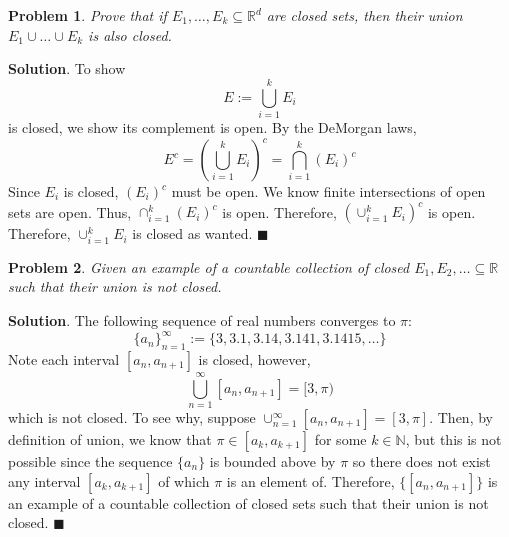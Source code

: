 \documentclass[12pt]{article}
\renewcommand{\=}[1]{\stackrel{#1}{=}} %
\newtheorem{p}{Problem}[section]
\theoremstyle{definition}
\newenvironment{s}{%
        \begin{trivlist} \item \textbf{Solution}. }{%
            \hspace*{\fill} $\blacksquare$\end{trivlist}}%
\begin{document}
\begin{p}
    Prove that if $E_1,\hdots,E_k\subseteq\mathbb{R}^d$ are closed sets, then their union $E_1\cup\hdots\cup E_k$ is also closed.
\end{p}
\begin{s}
    To show
    \[ E := \bigcup_{i=1}^k E_i \]
    is closed, we show its complement is open. By the DeMorgan laws,
    \[ E^c = (\bigcup_{i=1}^k E_i)^c = \bigcap_{i=1}^k (E_i)^c \]
    Since $E_i$ is closed, $(E_i)^c$ must be open. We know finite intersections of open sets are open. Thus, $\cap_{i=1}^k (E_i)^c$
    is open. Therefore, $(\cup_{i=1}^k E_i)^c$ is open. Therefore, $\cup_{i=1}^k E_i$ is closed as wanted.
\end{s}

\begin{p}
    Given an example of a countable collection of closed $E_1,E_2,\hdots\subseteq\mathbb{R}$ such that their union is not closed.
\end{p}
\begin{s}
    The following sequence of real numbers converges to $\pi$:
    \[ \{a_n\}_{n=1}^{\infty} := \{3,3.1,3.14,3.141,3.1415,\hdots\} \]
    Note each interval $[a_n,a_{n+1}]$ is closed, however,
    \[ \bigcup_{n=1}^{\infty} [a_n,a_{n+1}] = [3,\pi) \]
    which is not closed. To see why, suppose $\cup_{n=1}^{\infty} [a_n,a_{n+1}] = [3,\pi]$. Then, by definition of union,
    we know that $\pi\in[a_k,a_{k+1}]$ for some $k\in\mathbb{N}$, but this is not possible since the sequence $\{a_n\}$ is bounded
    above by $\pi$ so there does not exist any interval $[a_k,a_{k+1}]$ of which $\pi$ is an element of. Therefore, $\{[a_n,a_{n+1}]\}$
    is an example of a countable collection of closed sets such that their union is not closed.
\end{s}
\end{document}

